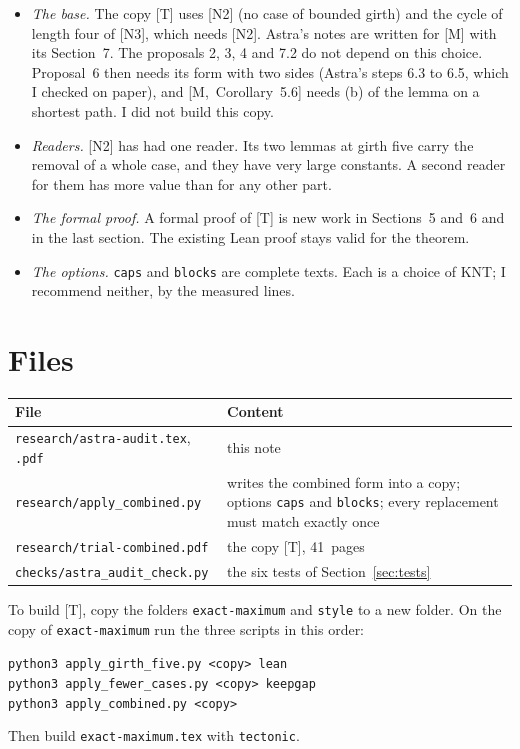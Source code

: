 \documentclass[11pt]{article}
\newcommand{\M}[1]{[M,~#1]}
\begin{document}
\begin{itemize}[leftmargin=1.2em]
\item \emph{The base.} The copy [T] uses [N2] (no case of bounded girth) and the cycle of length
four of [N3], which needs [N2]. Astra's notes are written for [M] with its Section~7. The
proposals 2, 3, 4 and 7.2 do not depend on this choice. Proposal~6 then needs its form with two
sides (Astra's steps 6.3 to 6.5, which I checked on paper), and \M{Corollary~5.6} needs (b) of
the lemma on a shortest path. I did not build this copy.
\item \emph{Readers.} [N2] has had one reader. Its two lemmas at girth five carry the removal of
a whole case, and they have very large constants. A second reader for them has more value than
for any other part.
\item \emph{The formal proof.} A formal proof of [T] is new work in Sections~5 and~6 and in the
last section. The existing Lean proof stays valid for the theorem.
\item \emph{The options.} \texttt{caps} and \texttt{blocks} are complete texts. Each is a choice
of KNT; I recommend neither, by the measured lines.
\end{itemize}

\section{Files}\label{sec:files}

\begin{center}\small
\begin{tabular}{@{}p{6.1cm}p{8.4cm}@{}}
\toprule
\textsf{\textbf{File}} & \textsf{\textbf{Content}}\\
\midrule
\texttt{research/astra-audit.tex}, \texttt{.pdf} & this note\\
\texttt{research/apply\_combined.py} & writes the combined form into a copy; options
\texttt{caps} and \texttt{blocks}; every replacement must match exactly once\\
\texttt{research/trial-combined.pdf} & the copy [T], 41~pages\\
\texttt{checks/astra\_audit\_check.py} & the six tests of Section~\ref{sec:tests}\\
\bottomrule
\end{tabular}
\end{center}

\noindent To build [T], copy the folders \texttt{exact-maximum} and \texttt{style} to a new
folder. On the copy of \texttt{exact-maximum} run the three scripts in this order:
\begin{center}
\texttt{python3 apply\_girth\_five.py <copy> lean}\\
\texttt{python3 apply\_fewer\_cases.py <copy> keepgap}\\
\texttt{python3 apply\_combined.py <copy>}
\end{center}
Then build \texttt{exact-maximum.tex} with \texttt{tectonic}.
\end{document}
